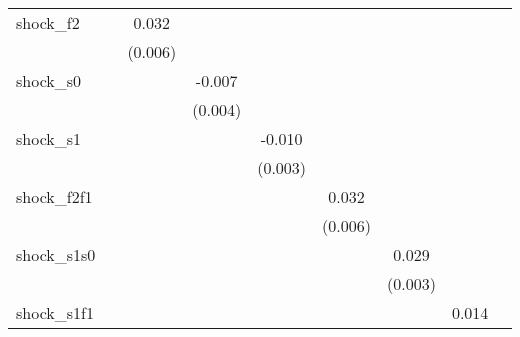 {\begin{tabular}{l*{8}{c}}
\addlinespace
shock\_f2    &                     &       0.032\sym{***}&                     &                     &                     &                     &                     &                     \\
            &                     &     (0.006)         &                     &                     &                     &                     &                     &                     \\
\addlinespace
shock\_s0    &                     &                     &      -0.007\sym{*}  &                     &                     &                     &                     &                     \\
            &                     &                     &     (0.004)         &                     &                     &                     &                     &                     \\
\addlinespace
shock\_s1    &                     &                     &                     &      -0.010\sym{***}&                     &                     &                     &                     \\
            &                     &                     &                     &     (0.003)         &                     &                     &                     &                     \\
\addlinespace
shock\_f2f1  &                     &                     &                     &                     &       0.032\sym{***}&                     &                     &                     \\
            &                     &                     &                     &                     &     (0.006)         &                     &                     &                     \\
\addlinespace
shock\_s1s0  &                     &                     &                     &                     &                     &       0.029\sym{***}&                     &                     \\
            &                     &                     &                     &                     &                     &     (0.003)         &                     &                     \\
\addlinespace
shock\_s1f1  &                     &                     &                     &                     &                     &                     &       0.014\sym{*}  &                     \\

\end{tabular}}
